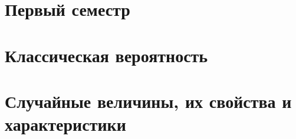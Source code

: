 \documentclass[A4,12pt,oneside]{book}
\begin{document}

\restoregeometry



\part*{Первый семестр}
\part{Классическая вероятность}





\part{Случайные величины, их свойства и характеристики}













\nocite{*} %
\printbibliography %
\end{document}
